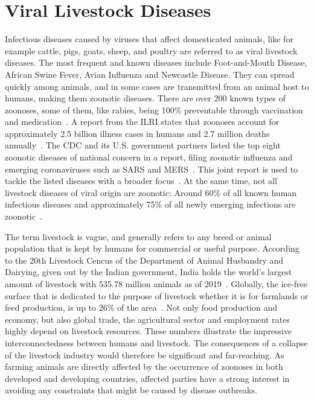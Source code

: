 \section{Viral Livestock Diseases}\label{sec:viral} 
Infectious diseases caused by viruses that affect domesticated animals, like for example cattle, pigs, goats, sheep, and poultry are referred to as viral livestock diseases. The most frequent and known diseases include Foot-and-Mouth Disease, African Swine Fever, Avian Influenza and Newcastle Disease. They can spread quickly among animals, and in some cases are transmitted from an animal host to humans, making them zoonotic diseases. There are over 200 known types of zoonoses, some of them, like rabies, being 100\% preventable through vaccination and medication~\cite{who2020zoon}. A report from the \ac{ILRI} states that zoonoses account for approximately 2.5 billion illness cases in humans and 2.7 million deaths annually~\cite{grace2012mapping}. The \ac{CDC} and its U.S. government partners listed the top eight zoonotic diseases of national concern in a report, filing zoonotic influenza and emerging coronaviruses such as \ac{SARS} and \ac{MERS}~\cite{brown2006recent}. This joint report is used to tackle the listed diseases with a broader focus~\cite{centers8zoonotic}. At the same time, not all livestock diseases of viral origin are zoonotic: Around 60\% of all known human infectious diseases and approximately 75\% of all newly emerging infections are zoonotic~\cite{jones2008global}.

The term livestock is vague, and generally refers to any breed or animal population that is kept by humans for commercial or useful purpose. According to the 20th Livestock Cencus of the Department of Animal Husbandry and Dairying, given out by the Indian government, India holds the world's largest amount of livestock with 535.78 million animals as of 2019~\cite{livestock2019}. Globally, the ice-free surface that is dedicated to the purpose of livestock whether it is for farmlands or feed production, is up to 26\% of the area~\cite{steinfeld2006livestock}. Not only food production and economy, but also global trade, the agricultural sector and employment rates highly depend on livestock resources. These numbers illustrate the impressive interconnectedness between humans and livestock. The consequences of a collapse of the livestock industry would therefore be significant and far-reaching. As farming animals are directly affected by the occurrence of zoonoses in both developed and developing countries, affected parties have a strong interest in avoiding any constraints that might be caused by disease outbreaks.

